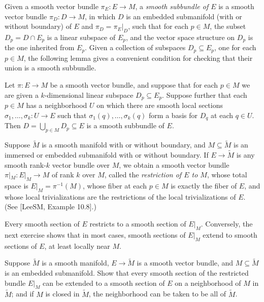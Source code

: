 Given a smooth vector bundle $\pi_E: E \to M$, a \textit{smooth subbundle of $E$} is a smooth vector bundle $\pi_D: D \to M$, in which $D$ is an embedded submanifold (with or without boundary) of $E$ and $\pi_D = \pi_E|_D$, such that for each $p \in M$, the subset $D_p = D \cap E_p$ is a linear subspace of $E_p$, and the vector space structure on $D_p$ is the one inherited from $E_p$. Given a collection of subspaces $D_p \subseteq E_p$, one for each $p \in M$, the following lemma gives a convenient condition for checking that their union is a smooth subbundle.

\begin{lemma}
\label{lem:local-frame-criterion-for-subbundles}
Let $\pi: E \to M$ be a smooth vector bundle, and suppose that for each $p \in M$ we are given a $k$-dimensional linear subspace $D_p \subseteq E_p$. Suppose further that each $p \in M$ has a neighborhood $U$ on which there are smooth local sections $\sigma_1, \ldots, \sigma_k: U \to E$ such that $\sigma_1(q), \ldots, \sigma_k(q)$ form a basis for $D_q$ at each $q \in U$. Then $D = \bigcup_{p \in M} D_p \subseteq E$ is a smooth subbundle of $E$.
\end{lemma}

Suppose $\tilde{M}$ is a smooth manifold with or without boundary, and $M \subseteq \tilde{M}$ is an immersed or embedded submanifold with or without boundary. If $E \to \tilde{M}$ is any smooth rank-$k$ vector bundle over $M$, we obtain a smooth vector bundle $\pi|_M : E|_M \to M$ of rank $k$ over $M$, called the \emph{restriction of $E$ to $M$}, whose total space is $E|_M = \pi^{-1}(M)$, whose fiber at each $p \in M$ is exactly the fiber of $E$, and whose local trivializations are the restrictions of the local trivializations of $E$. (See [LeeSM, Example 10.8].)

Every smooth section of $E$ restricts to a smooth section of $E|_M$. Conversely, the next exercise shows that in most cases, smooth sections of $E|_M$ extend to smooth sections of $E$, at least locally near $M$.

\begin{exercise}
\label{exer:smooth-section-extension}
Suppose $\tilde{M}$ is a smooth manifold, $E \to \tilde{M}$ is a smooth vector bundle, and $M \subseteq \tilde{M}$ is an embedded submanifold. Show that every smooth section of the restricted bundle $E|_M$ can be extended to a smooth section of $E$ on a neighborhood of $M$ in $\tilde{M}$; and if $M$ is closed in $\tilde{M}$, the neighborhood can be taken to be all of $\tilde{M}$.
\end{exercise}

